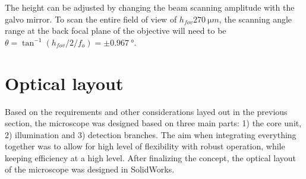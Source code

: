     The height can be adjusted by changing the beam scanning amplitude with the galvo mirror. To scan the entire field of view of $h_{fov} \SI{270}{\micro m}$, the scanning angle range at the back focal plane of the objective will need to be $ \theta = \tan^{-1}(h_{fov}/2/f_o) = \pm \SI{0.967}{\degree}$.


      


\section{Optical layout}
  
  Based on the requirements and other considerations layed out in the previous section, the microscope was designed based on three main parts: 1) the core unit, 2) illumination and 3) detection branches. The aim when integrating everything together was to allow for high level of flexibility with robust operation, while keeping efficiency at a high level. After finalizing the concept, the optical layout of the microscope was designed in SolidWorks.



